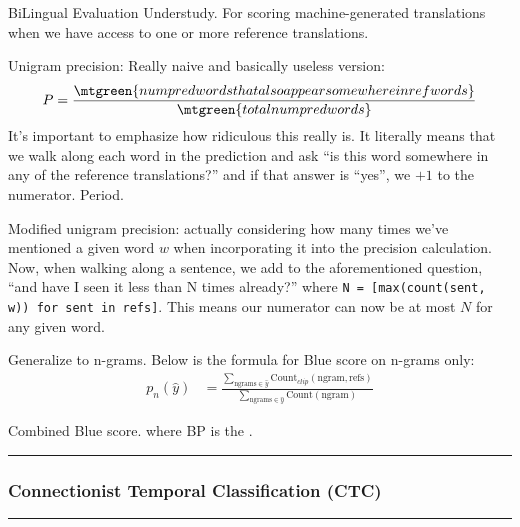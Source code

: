 \documentclass[11pt]{article}
\newcommand\myspace[1][]{\vspace{#1\bigskipamount}}
\newcommand\subsub[1]{\Needspace{15\baselineskip}\hrule\subsubsection{#1}\hrule}
\begin{document}
BiLingual Evaluation Understudy. For scoring machine-generated translations when we have access to one or more reference translations.
\begin{compactitem}
	\item Unigram precision: Really naive and basically useless version:
	\begin{align}
		P = \frac{
			\mtgreen{num pred words that also appear somewhere in ref words} }{
			\mtgreen{total num pred words}
		}
	\end{align}
	It's important to emphasize how ridiculous this really is. It literally means that we walk along each word in the prediction and ask ``is this word somewhere in any of the reference translations?'' and if that answer is ``yes'', we ${+}1$ to the numerator. Period.
	
	\item Modified unigram precision: actually considering how many times we've mentioned a given word $w$ when incorporating it into the precision calculation. Now, when walking along a sentence, we add to the aforementioned question, ``\textellipsis and have I seen it less than N times already?'' where \texttt{N = [max(count(sent, w)) for sent in refs]}. This means our numerator can now be at most $N$ for any given word.
	
	\item Generalize to n-grams. Below is the formula for Blue score on n-grams only:
	\begin{align}
		p_n(\hat y)
			&= \frac{  
				\sum_{\text{ngrams} \in \hat y} \text{Count}_{clip}(\text{ngram}, \text{refs})
				 }{
				 \sum_{\text{ngrams} \in \hat y} \text{Count}(\text{ngram})
				}
	\end{align}
	
	\item Combined Blue score. 
	where BP is the . 
\end{compactitem}

\myspace
\subsub{Connectionist Temporal Classification (CTC)}
\myspace
\end{document}
